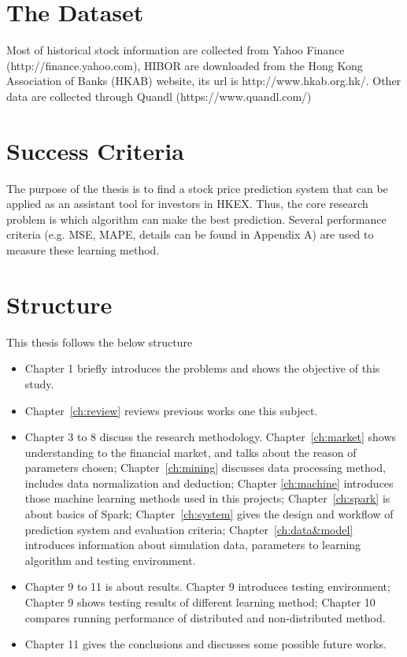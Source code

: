 \section{The Dataset}
Most of historical stock information are collected from Yahoo Finance (http://finance.yahoo.com), HIBOR are downloaded from the Hong Kong Association of Banks (HKAB) website, its url is http://www.hkab.org.hk/. Other data are collected through Quandl (https://www.quandl.com/)

\section{Success Criteria}
The purpose of the thesis is to find a stock price prediction system that can be applied as an assistant tool for investors in HKEX. Thus, the core research problem is which algorithm can make the best prediction. Several performance criteria (e.g. MSE, MAPE, details can be found in Appendix A) are used to measure these learning method.


\section{Structure}


This thesis follows the below structure\par
\begin{itemize}
	\item Chapter 1 briefly introduces the problems and shows the objective of this study.
	\item Chapter~\ref{ch:review} reviews previous works one this subject.
	\item Chapter 3 to 8 discuss the research methodology. Chapter~\ref{ch:market} shows understanding to the financial market, and talks about the reason of parameters chosen; Chapter~\ref{ch:mining} discusses data processing method, includes data normalization and deduction; Chapter \ref{ch:machine} introduces those machine learning methods used in this projects; Chapter~\ref{ch:spark} is about basics of Spark; Chapter~\ref{ch:system} gives the design and workflow of prediction system and evaluation criteria; Chapter~\ref{ch:data&model} introduces information about simulation data, parameters to learning algorithm and testing environment.
	\item Chapter 9 to 11 is about results. Chapter 9 introduces testing environment; Chapter 9 shows testing results of different learning method; Chapter 10 compares running performance of distributed and non-distributed method.
	\item Chapter 11 gives the conclusions and discusses some possible future works.
\end{itemize}

